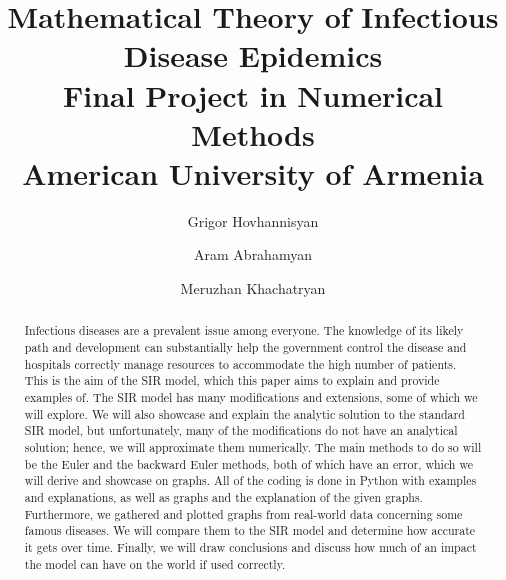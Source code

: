 \documentclass[a4paper,12pt]{article}
\title{ 
    Mathematical Theory of Infectious Disease Epidemics \\
        \large Final Project in Numerical Methods \\ American University of Armenia \\
}
\author{Grigor Hovhannisyan
\and
Aram Abrahamyan
\and
Meruzhan Khachatryan
}
\begin{document}
{ %
\maketitle\thispagestyle{empty}
\vspace{1cm}{}
}
\vspace{1cm}


{
\newpage
{}
\hypersetup{linkcolor=black} %
\tableofcontents
}

\newpage
\begin{abstract}
Infectious diseases are a prevalent issue among everyone. 
The knowledge of its likely path and development can substantially help the government control the disease and hospitals correctly manage resources to accommodate the high number of patients. 
This is the aim of the SIR model, which this paper aims to explain and provide examples of. 
The SIR model has many modifications and extensions, some of which we will explore. 
We will also showcase and explain the analytic solution to the standard SIR model, but unfortunately, many of the modifications do not have an analytical solution; hence, we will approximate them numerically. 
The main methods to do so will be the Euler and the backward Euler methods, both of which have an error, which we will derive and showcase on graphs. 
All of the coding is done in Python with examples and explanations, as well as graphs and the explanation of the given graphs.
Furthermore, we gathered and plotted graphs from real-world data concerning some famous diseases. 
We will compare them to the SIR model and determine how accurate it gets over time. 
Finally, we will draw conclusions and discuss how much of an impact the model can have on the world if used correctly.
\end{abstract}

\newpage
\pagestyle{fancy} %
\lhead{\nouppercase{\rightmark}}
\rhead{}









\newpage
\thispagestyle{SectionFirstPage} %
\rhead{}
\printbibliography

\appendix
\renewcommand\thefigure{\thesection.\arabic{figure}}
\renewcommand\thetable{\thesection.\arabic{table}} %
\lhead{\nouppercase{\rightmark}} %
\rhead{}


\end{document}
